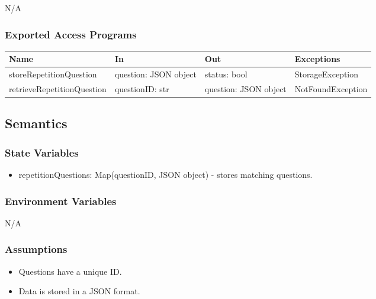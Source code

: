 \documentclass[12pt, titlepage]{article}
\begin{document}
N/A

\subsubsection{Exported Access Programs}

\begin{center}
\begin{tabular}{p{5cm} p{3cm} p{3cm} p{5cm}}
\hline
\textbf{Name} & \textbf{In} & \textbf{Out} & \textbf{Exceptions} \\
\hline
storeRepetitionQuestion & \raggedright\arraybackslash question: JSON object & \raggedright\arraybackslash status: bool & \raggedright\arraybackslash StorageException \\
\hline
retrieveRepetitionQuestion & \raggedright\arraybackslash questionID: str & \raggedright\arraybackslash question: JSON object & \raggedright\arraybackslash NotFoundException \\
\hline
\end{tabular}
\end{center}

\subsection{Semantics}

\subsubsection{State Variables}

\begin{itemize}
  \item repetitionQuestions: Map(questionID, JSON object) - stores matching questions.
\end{itemize}

\subsubsection{Environment Variables}

N/A

\subsubsection{Assumptions}

\begin{itemize}
  \item Questions have a unique ID.
  \item Data is stored in a JSON format.
\end{itemize}
\end{document}
